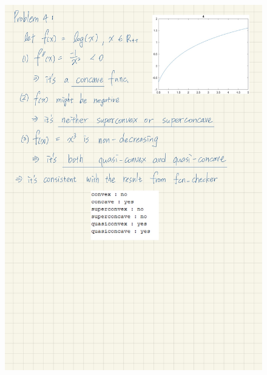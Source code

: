 \documentclass[a4paper, onecolumn, , 11pt]{IEEEtran}
\begin{document}
    \begin{figure}
        \centering
        \includegraphics[width=1\textwidth]{proofs/prob4.jpg}
    \end{figure}
\end{document}
